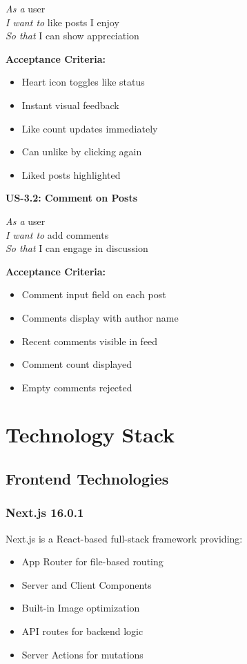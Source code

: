 \documentclass[12pt,a4paper]{report}
\begin{document}
\textit{As a} user \\
\textit{I want to} like posts I enjoy \\
\textit{So that} I can show appreciation

\textbf{Acceptance Criteria:}
\begin{itemize}
    \item Heart icon toggles like status
    \item Instant visual feedback
    \item Like count updates immediately
    \item Can unlike by clicking again
    \item Liked posts highlighted
\end{itemize}

\textbf{US-3.2: Comment on Posts}

\textit{As a} user \\
\textit{I want to} add comments \\
\textit{So that} I can engage in discussion

\textbf{Acceptance Criteria:}
\begin{itemize}
    \item Comment input field on each post
    \item Comments display with author name
    \item Recent comments visible in feed
    \item Comment count displayed
    \item Empty comments rejected
\end{itemize}

\chapter{Technology Stack}

\section{Frontend Technologies}

\subsection{Next.js 16.0.1}

Next.js is a React-based full-stack framework providing:
\begin{itemize}
    \item App Router for file-based routing
    \item Server and Client Components
    \item Built-in Image optimization
    \item API routes for backend logic
    \item Server Actions for mutations
\end{itemize}
\end{document}

